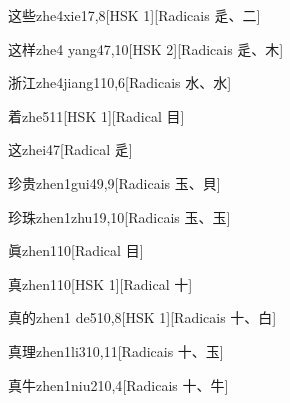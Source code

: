 \begin{entry}{这些}{zhe4xie1}{7,8}[HSK 1][Radicais ⾡、⼆]
\end{entry}

\begin{entry}{这样}{zhe4 yang4}{7,10}[HSK 2][Radicais ⾡、⽊]
\end{entry}

\begin{entry}{浙江}{zhe4jiang1}{10,6}[Radicais ⽔、⽔]
\end{entry}

\begin{entry}{着}{zhe5}{11}[HSK 1][Radical ⽬]
\end{entry}

\begin{entry}{这}{zhei4}{7}[Radical ⾡]
\end{entry}

\begin{entry}{珍贵}{zhen1gui4}{9,9}[Radicais ⽟、⾙]
\end{entry}

\begin{entry}{珍珠}{zhen1zhu1}{9,10}[Radicais ⽟、⽟]
\end{entry}

\begin{entry}{眞}{zhen1}{10}[Radical ⽬]
\end{entry}

\begin{entry}{真}{zhen1}{10}[HSK 1][Radical ⼗]
\end{entry}

\begin{entry}{真的}{zhen1 de5}{10,8}[HSK 1][Radicais ⼗、⽩]
\end{entry}

\begin{entry}{真理}{zhen1li3}{10,11}[Radicais ⼗、⽟]
\end{entry}

\begin{entry}{真牛}{zhen1niu2}{10,4}[Radicais ⼗、⽜]
\end{entry}

